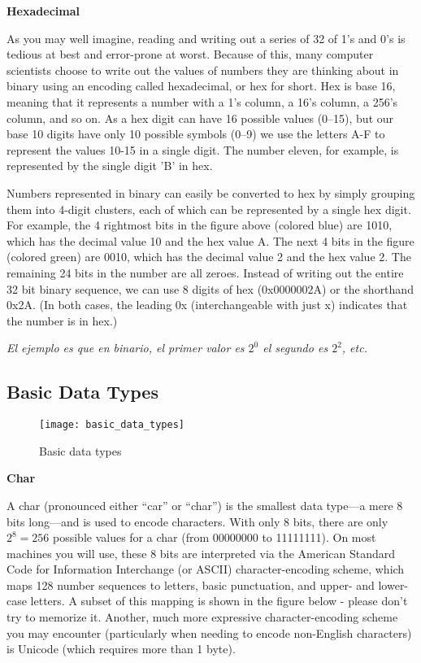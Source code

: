 \documentclass[11pt, a4paper]{article}
\begin{document}
\textbf{Hexadecimal}

As you may well imagine, reading and writing out a series of 32 of 1’s and 0’s is tedious at best and error-prone at worst. Because of this, many computer scientists choose to write out the values of numbers they are thinking about in binary using an encoding called hexadecimal, or hex for short. Hex is base 16, meaning that it represents a number with a 1’s column, a 16’s column, a 256’s column, and so on. As a hex digit can have 16 possible values (0–15), but our base 10 digits have only 10 possible symbols (0–9) we use the letters A-F to represent the values 10-15 in a single digit. The number eleven, for example, is represented by the single digit ’B’ in hex.

Numbers represented in binary can easily be converted to hex by simply grouping them into 4-digit clusters, each of which can be represented by a single hex digit. For example, the 4 rightmost bits in the figure above (colored blue) are 1010, which has the decimal value 10 and the hex value A. The next 4 bits in the figure (colored green) are 0010, which has the decimal value 2 and the hex value 2. The remaining 24 bits in the number are all zeroes. Instead of writing out the entire 32 bit binary sequence, we can use 8 digits of hex (0x0000002A) or the shorthand 0x2A. (In both cases, the leading 0x (interchangeable with just x) indicates that the number is in hex.)

\textit{El ejemplo es que en binario, el primer valor es $2^0$ el segundo es $2^2$, etc.}


\subsection{Basic Data Types}%
\label{sub:basic_data_types}

\begin{figure}[htpb]
  \centering
  \texttt{[image: basic\_data\_types]}
  \caption{Basic data types}
  \label{fig:basic_data_types}
\end{figure}



\textbf{Char}


A char (pronounced either “car” or “char”) is the smallest data type—a mere 8 bits long—and is used to encode characters. With only 8 bits, there are only $2^{8}=256$ possible values for a char (from 00000000 to 11111111). On most machines you will use, these 8 bits are interpreted via the American Standard Code for Information Interchange (or ASCII) character-encoding scheme, which maps 128 number sequences to letters, basic punctuation, and upper- and lower-case letters. A subset of this mapping is shown in the figure below - please don’t try to memorize it. Another, much more expressive character-encoding scheme you may encounter (particularly when needing to encode non-English characters) is Unicode (which requires more than 1 byte).
\end{document}
